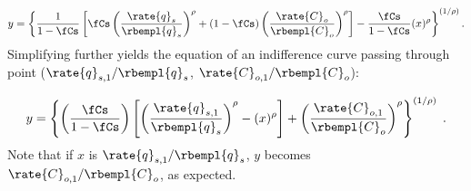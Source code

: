 \begin{equation}
  y = \left\{ \frac{1}{1 - \fCs} \left[ \fCs \left( \frac{\rate{q}_s}{\rbempl{q}_s} \right)^\rho 
        + (1-\fCs) \left( \frac{\rate{C}_o}{\rbempl{C}_o} \right)^\rho   \right] 
            - \frac{\fCs}{1 - \fCs} (x)^\rho \right\}^{(1/\rho)}  .
\end{equation}
%
Simplifying further yields
the equation of an indifference curve passing through point 
($\rate{q}_{s,1}/\rbempl{q}_s$, $\rate{C}_{o,1}/\rbempl{C}_o$):

\begin{equation} \label{eq:indiff_curve_eqn}
  y = \left\{ \left( \frac{\fCs}{1 - \fCs} \right) \left[ \left( \frac{\rate{q}_{s,1}}{\rbempl{q}_s} \right)^\rho 
                                                          - (x)^\rho  \right]
        + \left( \frac{\rate{C}_{o,1}}{\rbempl{C}_{o}} \right)^\rho \right\}^{(1/\rho)} \; .
\end{equation}
%
Note that if $x$ is $\rate{q}_{s,1}/\rbempl{q}_s$,
$y$ becomes $\rate{C}_{o,1}/\rbempl{C}_o$,
as expected.
